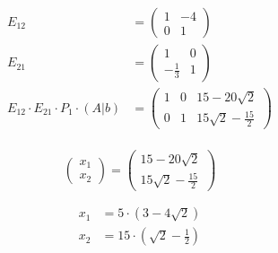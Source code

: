 \begin{align}
	E_{12}                                                   & = \begin{pmatrix}
		                                                             1 & -4 \\
		                                                             0 & 1
	                                                             \end{pmatrix}                            \\
	E_{21}                                                   & = \begin{pmatrix}
		                                                             1            & 0 \\
		                                                             -\frac{1}{3} & 1
	                                                             \end{pmatrix}                          \\
	E_{12} \cdot E_{21} \cdot P_1 \cdot \left( A | b \right) & = \left( \begin{array}{cc|c}
			                                                                    1 & 0 & 15 - 20\sqrt{2}            \\
			                                                                    0 & 1 & 15 \sqrt{2} - \frac{15}{2}
		                                                                    \end{array} \right) \\
\end{align}

\begin{equation}
	\begin{pmatrix}
		x_1 \\
		x_2
	\end{pmatrix} = \begin{pmatrix}
		15 - 20\sqrt{2} \\
		15 \sqrt{2} - \frac{15}{2}
	\end{pmatrix}
\end{equation}

\begin{align}
	x_1 & = 5 \cdot (3 - 4\sqrt{2})           \\
	x_2 & = 15 \cdot (\sqrt{2} - \frac{1}{2})
\end{align}
